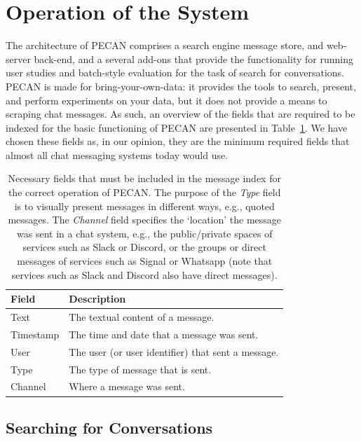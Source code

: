 \graphicspath{ {./images/} }
\section{Operation of the System}

The architecture of PECAN comprises a search engine message store, and web-server back-end, and a several add-ons that provide the functionality for running user studies and batch-style evaluation for the task of search for conversations. PECAN is made for bring-your-own-data: it provides the tools to search, present, and perform experiments on your data, but it does not provide a means to scraping chat messages. As such, an overview of the fields that are required to be indexed for the basic functioning of PECAN are presented in Table~\ref{table:fields}. We have chosen these fields as, in our opinion, they are the minimum required fields that almost all chat messaging systems today would use.

\begin{table}
\centering
\begin{tabular}{ll}
	\hline
	Field     & Description                                        \\ \hline
	Text      & The textual content of a message.                  \\
	Timestamp & The time and date that a message was sent.         \\
	User      & The user (or user identifier) that sent a message. \\
	Type      & The type of message that is sent.                  \\
	Channel   & Where a message was sent.                          \\ \hline
\end{tabular}
\caption{Necessary fields that must be included in the message index for the correct operation of PECAN. The purpose of the \textit{Type} field is to visually present messages in different ways, e.g., quoted messages. The \textit{Channel} field specifies the `location' the message was sent in a chat system, e.g., the public/private spaces of services such as Slack or Discord, or the groups or direct messages of services such as Signal or Whatsapp (note that services such as Slack and Discord also have direct messages).}
\label{table:fields}
\end{table}

\subsection{Searching for Conversations}

